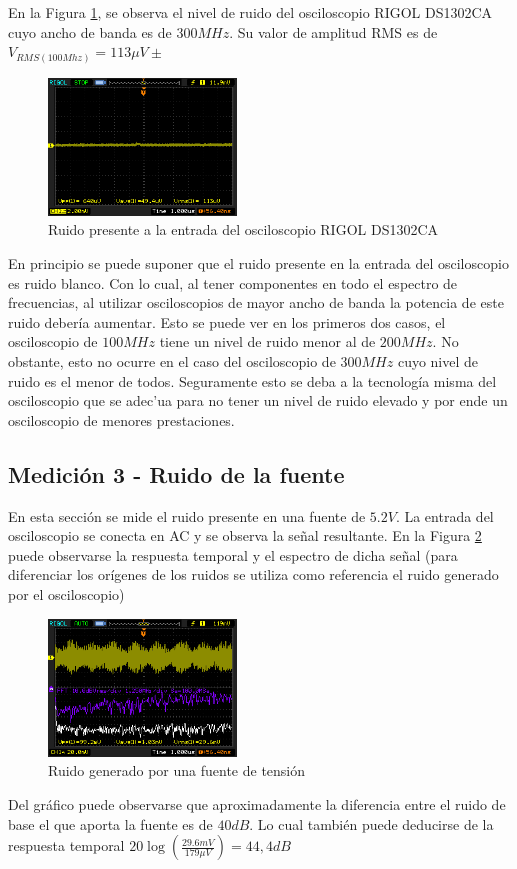 \documentclass[a4paper,10pt]{article}
\begin{document}
	En la Figura \ref{img007}, se observa el nivel de ruido del osciloscopio RIGOL DS1302CA cuyo ancho de banda es de $300MHz$.
	Su valor de amplitud RMS es de $V_{RMS(100Mhz)}=113\mu V \pm $	
		\begin{figure}[!htb]
			\centering
			\includegraphics[width=5cm]
			{Imagenes/Ruido300Mhz.png}
			\caption{Ruido presente a la entrada del osciloscopio RIGOL DS1302CA}
			\label{img007}
		\end{figure}
	En principio se puede suponer que el ruido presente en la entrada del osciloscopio es ruido blanco. Con lo cual, al tener componentes en todo el espectro de frecuencias, al utilizar osciloscopios de mayor ancho de banda la potencia de este ruido deber\'ia aumentar. Esto se puede ver en los primeros dos casos, el osciloscopio de $100MHz$ tiene un nivel de ruido menor al de $200MHz$. 
	No obstante, esto no ocurre en el caso del osciloscopio de $300MHz$ cuyo nivel de ruido es el menor de todos. Seguramente esto se deba a la tecnolog\'ia misma del osciloscopio que se adec'ua para no tener un nivel de ruido elevado y por ende un osciloscopio de menores prestaciones.
	
			
	\subsection{Medición 3 - Ruido de la fuente}
	En esta secci\'on se mide el ruido presente en una fuente de $5.2V$. La entrada del osciloscopio se conecta en AC y se observa la se\~nal resultante. En la Figura \ref{img008} puede observarse la respuesta temporal y el espectro de dicha se\~nal (para diferenciar los or\'igenes de los ruidos se utiliza como referencia el ruido generado por el osciloscopio)
		\begin{figure}[!htb]
			\centering
			\includegraphics[width=5cm]
			{Imagenes/RuidoFuente.png}
			\caption{Ruido generado por una fuente de tensi\'on}
			\label{img008}
		\end{figure}
	Del gr\'afico puede observarse que aproximadamente la diferencia entre el ruido de base  el que aporta la fuente es de $40dB$. Lo cual tambi\'en puede deducirse de la respuesta temporal $20\log(\frac{29.6mV}{179\mu V})=44,4dB$
\end{document}
